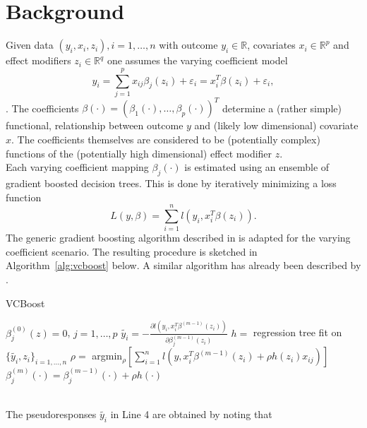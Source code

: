 \documentclass{article}
\begin{document}
\section{Background}

Given data $(y_i, x_i, z_i), i = 1, \dots, n$ with outcome $y_i \in \mathbb{R}$, covariates $x_i \in \mathbb{R}^p$ and effect modifiers $z_i \in \mathbb{R}^q$ one assumes the varying coefficient model
%
\begin{equation}
y_i = \sum_{j=1}^p x_{ij} \beta_j(z_i) + \varepsilon_i = x_i^T \beta(z_i) + \varepsilon_i,
\end{equation}
%
\cite{hastie1993varying}. The coefficients $\beta(\cdot) = (\beta_1(\cdot), \dots, \beta_p(\cdot))^T$ determine a (rather simple) functional, relationship between outcome $y$ and (likely low dimensional) covariate $x$. The coefficients themselves are considered to be (potentially complex) functions of the (potentially high dimensional) effect modifier $z$.\\
Each varying coefficient mapping $\beta_j(\cdot)$ is estimated using an ensemble of gradient
boosted decision trees. This is done by iteratively minimizing a loss function
%
\begin{equation}
    L(y, \beta) = \sum_{i=1}^n l(y_i, x_i^T\beta(z_i)).
\end{equation}
%
The generic gradient boosting algorithm described in \cite{friedman2001greedy} is adapted for the varying coefficient scenario. The resulting procedure is sketched in Algorithm~\ref{alg:vcboost} below. A similar algorithm has already been described by \cite{zhou2019tree}.
%
\begin{algorithm}[h]
\caption{VCBoost}
\label{alg:vcboost}
	\begin{algorithmic}[1]
		\State $\beta_j^{(0)}(z) = 0$, $j = 1, \dots, p$
				\State $\tilde{y_i} = - \frac{\partial l(y_i, x_i^T\beta^{(m-1)}(z_i))}{\partial \beta_j^{(m-1)}(z_i)}$ 
				\State $h = $ regression tree fit on $\{\tilde{y_i}, z_i\}_{i=1, \dots, n}$
				\State $\rho = $ argmin$_{\rho} \left[ \sum_{i=1}^n l (y, x_i^T\beta^{(m-1)}(z_i) + \rho h(z_i) x_{ij}) \right]$ 
				\State $\beta_j^{(m)}(\cdot) = \beta_j^{(m-1)}(\cdot) + \rho h(\cdot)$
			\EndFor
		\EndFor
	\end{algorithmic}
\end{algorithm}\\
%
The pseudoresponses $\tilde{y_i}$ in Line 4 are obtained by noting that
\end{document}
